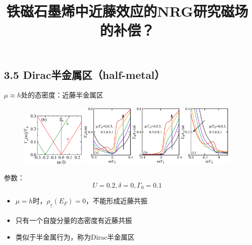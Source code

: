 \documentclass[9pt,t]{beamer} %
\begin{document}
\subsection{3.5 Dirac半金属区（half-metal）}
\title{铁磁石墨烯中近藤效应的NRG研究\qquad \qquad \qquad \qquad 磁场的补偿？}
\begin{frame}{$\mu\approx h$处的态密度：近藤半金属区}
\begin{figure}
\includegraphics[width=0.28\textwidth,height=0.27\textwidth]{hyb2.png}
\includegraphics[width=0.7\textwidth]{dos-mu=h.png}
\end{figure}
参数：
\[U=0.2,\delta=0,\Gamma_{0}=0.1\]
\begin{itemize}
\vspace{0.3cm}
\setlength\itemsep{0.5em}
\item $\mu=h$时，$\rho_{\uparrow}(E_{F})=0$，不能形成近藤共振
\item 只有一个自旋分量的态密度有近藤共振
\item 类似于半金属行为，称为Dirac半金属区
\end{itemize}
\end{frame}
\end{document}
